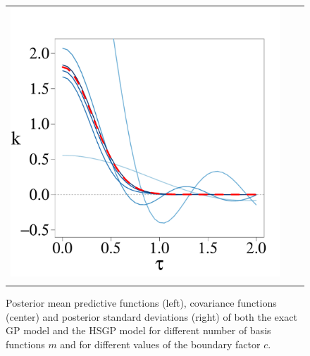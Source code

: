 \documentclass[onecolumn,a4paper,11pt]{article}
\begin{document}
\begin{figure}
\begin{tabular}{ c c c }
\includegraphics[scale=0.215, trim = 0mm 4mm 5mm 14mm, clip]{ch5_fig3_Cov_part6.pdf} &\\
\arrayrulecolor{darkgray}\hline
\end{tabular}
\caption{Posterior mean predictive functions (left), covariance functions (center) and posterior standard deviations (right) of both the exact GP model and the HSGP model for different number of basis functions $m$ and for different values of the boundary factor $c$. %
}
  \label{fig3_Post_part1}
\end{figure}
\end{document}
